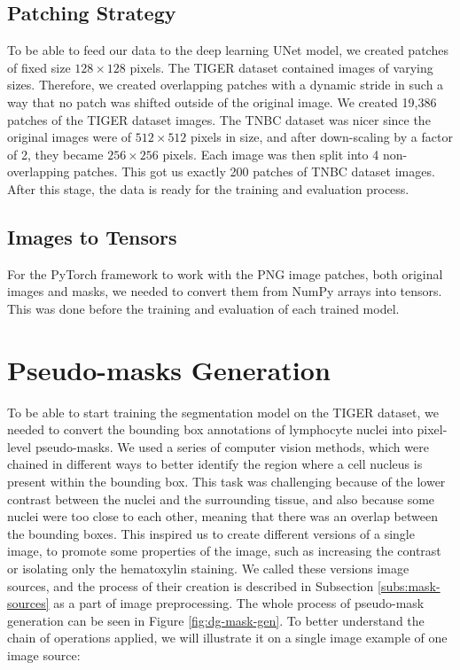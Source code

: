 \subsection{Patching Strategy}
To be able to feed our data to the deep learning UNet model, we created patches of fixed size $128\!\times\!128$ pixels. The TIGER dataset contained images of varying sizes. Therefore, we created overlapping patches with a dynamic stride in such a way that no patch was shifted outside of the original image. We created 19,386 patches of the TIGER dataset images. The TNBC dataset was nicer since the original images were of $512\!\times\!512$ pixels in size, and after down-scaling by a factor of 2, they became $256\!\times\!256$ pixels. Each image was then split into 4 non-overlapping patches. This got us exactly 200 patches of TNBC dataset images. After this stage, the data is ready for the training and evaluation process.

\subsection{Images to Tensors}
For the PyTorch framework to work with the PNG image patches, both original images and masks, we needed to convert them from NumPy arrays into tensors. This was done before the training and evaluation of each trained model.

\section{Pseudo-masks Generation}
\label{section:mask-generation}
To be able to start training the segmentation model on the TIGER dataset, we needed to convert the bounding box annotations of lymphocyte nuclei into pixel-level pseudo-masks. We used a series of computer vision methods, which were chained in different ways to better identify the region where a cell nucleus is present within the bounding box. This task was challenging because of the lower contrast between the nuclei and the surrounding tissue, and also because some nuclei were too close to each other, meaning that there was an overlap between the bounding boxes. This inspired us to create different versions of a single image, to promote some properties of the image, such as increasing the contrast or isolating only the hematoxylin staining. We called these versions image sources, and the process of their creation is described in Subsection \ref{subs:mask-sources} as a part of image preprocessing. The whole process of pseudo-mask generation can be seen in Figure \ref{fig:dg-mask-gen}. To better understand the chain of operations applied, we will illustrate it on a single image example of one image source:

